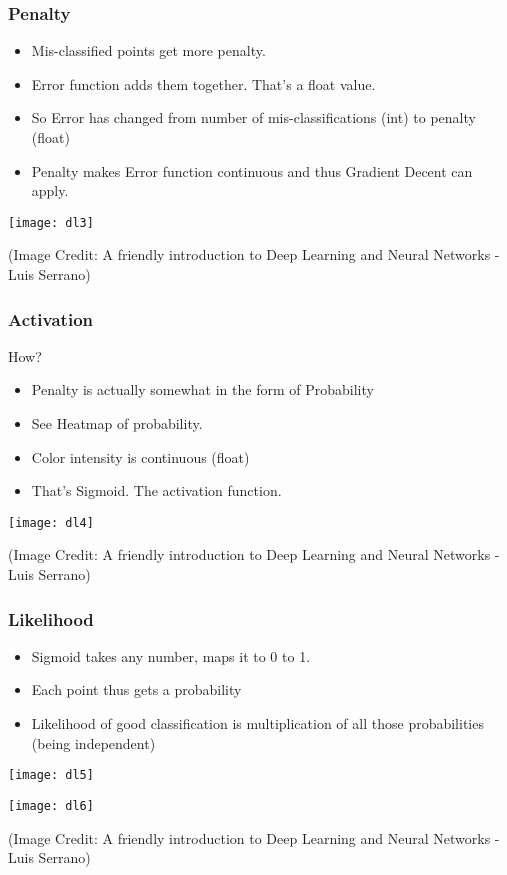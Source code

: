 \begin{frame}[fragile] \frametitle{Penalty}
\begin{itemize}
\item Mis-classified points get more penalty.
\item Error function adds them together. That's a float value.
\item So Error has changed from number of mis-classifications (int) to penalty (float)
\item Penalty makes Error function continuous and thus Gradient Decent can apply.
\end{itemize}
\begin{center}
\texttt{[image: dl3]}
\end{center}
{\tiny (Image Credit: A friendly introduction to Deep Learning and Neural Networks -  Luis Serrano)}
\end{frame}

\begin{frame}[fragile] \frametitle{Activation}
How?
\begin{itemize}
\item Penalty is actually somewhat in the form of Probability
\item See Heatmap of probability.
\item Color intensity is continuous (float)
\item That's Sigmoid. The activation function.
\end{itemize}
\begin{center}
\texttt{[image: dl4]}
\end{center}
{\tiny (Image Credit: A friendly introduction to Deep Learning and Neural Networks -  Luis Serrano)}
\end{frame}

\begin{frame}[fragile] \frametitle{Likelihood}
\begin{itemize}
\item Sigmoid takes any number, maps it to 0 to 1.
\item Each point thus gets a probability
\item Likelihood of good classification is multiplication of all those probabilities (being independent)
\end{itemize}
\begin{center}
\texttt{[image: dl5]}

\texttt{[image: dl6]}
\end{center}
{\tiny (Image Credit: A friendly introduction to Deep Learning and Neural Networks -  Luis Serrano)}
\end{frame}


